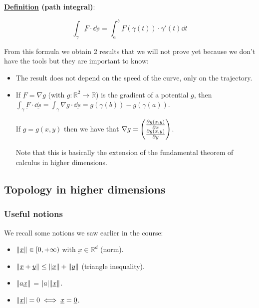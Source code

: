\documentclass[10pt]{extarticle}
\newcommand{\R}{\mathbb{R}}
\newcommand{\munderbar}[1]{\underbar{\ensuremath{#1}}}
\begin{document}
\textbf{\underline{Definition} (path integral)}:

$$
    \int_\gamma \munderbar{F} \cdot \dd{\munderbar{s}} = \int_a^b \munderbar{F}(\gamma(t)) \cdot \gamma'(t) \dd{t}
$$

From this formula we obtain 2 results that we will not prove yet because we don't have the tools but they are important to know:

\begin{itemize}
    \item The result does not depend on the speed of the curve, only on the trajectory.
    \item If $\munderbar{F} = \nabla g$ (with $g: \R^2 \to \R$) is the gradient of a potential $g$, then $\int_\gamma \munderbar{F} \cdot \dd{\munderbar{s}} = \int_\gamma \nabla g \cdot \dd{\munderbar{s}} = g(\gamma(b)) - g(\gamma(a))$.

          If $g = g(x, y)$ then we have that $\nabla g = \begin{pmatrix}
                  \pdv{g(x, y)}{x} \\ \pdv{g(x,y)}{y}
              \end{pmatrix}$.

          Note that this is basically the extension of the fundamental theorem of calculus in higher dimensions.
\end{itemize}

\subsection{Topology in higher dimensions}

\subsubsection{Useful notions}

We recall some notions we saw earlier in the course:

\begin{itemize}
    \item $\norm{\munderbar{x}} \in [0,+\infty)$ with $\munderbar{x} \in \R^d$ (norm).
    \item $\norm{\munderbar{x} + \munderbar{y}} \leq \norm{\munderbar{x}} + \norm{\munderbar{y}}$ (triangle inequality).
    \item $\norm{a \munderbar{x}}$ = $\abs{a} \norm{\munderbar{x}}$.
    \item $\norm{\munderbar{x}} = 0 \iff \munderbar{x} = \munderbar{0}$.
\end{itemize}
\end{document}
